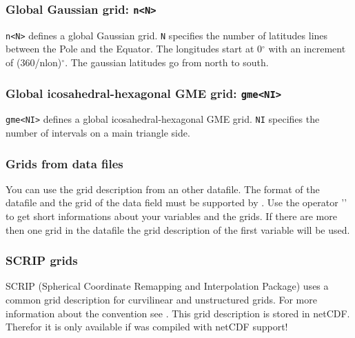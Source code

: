 \subsubsection*{Global Gaussian grid: {\tt n<N>}}
    {\tt n<N>} defines a global Gaussian grid. {\tt N} specifies the number of
    latitudes lines between the Pole and the Equator.
    The longitudes start at 0$^\circ$ with an increment of (360/nlon)$^\circ$.
    The gaussian latitudes go from north to south.


\subsubsection*{Global icosahedral-hexagonal GME grid: {\tt gme<NI>}}
    {\tt gme<NI>} defines a global icosahedral-hexagonal GME grid.
    {\tt NI} specifies the number of intervals on a main triangle side.

\subsubsection{Grids from data files}

You can use the grid description from an other datafile.
The format of the datafile and the grid of the data field must be supported by {\CDO} .
Use the operator '' to get short informations about your variables and the grids.
If there are more then one grid in the datafile the grid description of the first variable will be used.

\subsubsection{SCRIP grids}

SCRIP (Spherical Coordinate Remapping and Interpolation Package) uses
a common grid description for curvilinear and unstructured grids.
For more information about the convention see \cite{SCRIP}.
This grid description is stored in netCDF. Therefor it is only
available if {\CDO} was compiled with netCDF support!

\vspace{2mm}

